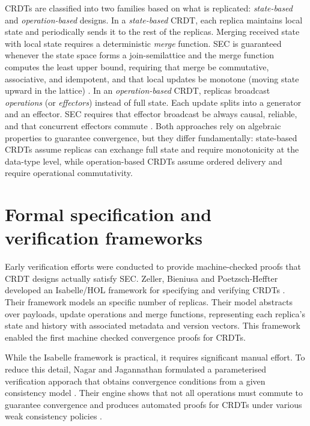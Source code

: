CRDTs are classified into two families based on what is replicated: \emph{state-based} and \emph{operation-based} designs. In a \emph{state-based} CRDT, each replica maintains local state and periodically sends it to the rest of the replicas. Merging received state with local state requires a deterministic \emph{merge} function. SEC is guaranteed whenever the state space forms a join-semilattice and the merge function computes the least upper bound, requiring that merge be commutative, associative, and idempotent, and that local updates be monotone (moving state upward in the lattice) \cite{zeller2014formal,shapiro2011conflict}. In an \emph{operation-based} CRDT, replicas broadcast \emph{operations} (or \emph{effectors}) instead of full state. Each update splits into a generator and an effector. SEC requires that effector broadcast be always causal, reliable, and that concurrent effectors commute \cite{shapiro2011conflict,nieto2022modular}. Both approaches rely on algebraic properties to guarantee convergence, but they differ fundamentally: state-based CRDTs assume replicas can exchange full state and require monotonicity at the data-type level, while operation-based CRDTs assume ordered delivery and require operational commutativity.

\section{Formal specification and verification frameworks}

Early verification efforts were conducted to provide machine‐checked proofs that CRDT designs actually satisfy SEC. Zeller, Bieniusa and Poetzsch‐Heffter developed an Isabelle/HOL framework for specifying and verifying CRDTs \cite{zeller2014formal}. Their framework models an specific number of replicas. Their model abstracts over payloads, update operations and merge functions, representing each replica’s state and history with associated metadata and version vectors. This framework enabled the first machine checked convergence proofs for CRDTs.

While the Isabelle framework is practical, it requires significant manual effort. To reduce this detail, Nagar and Jagannathan formulated a parameterised verification apporach that obtains convergence conditions from a given consistency model \cite{nagar2019automated}. Their engine shows that not all operations must commute to guarantee convergence and produces automated proofs for CRDTs under various weak consistency policies \cite{nagar2019automated}.

